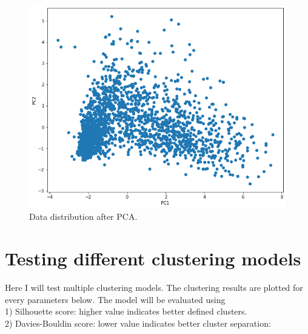 \documentclass[11pt]{article}
\begin{document}
\begin{figure}[h!]
\centerline{\includegraphics[scale=0.6]{clu_3.png}}
\caption{Data distribution after PCA.}
\end{figure}

\section{Testing different clustering models}\label{section-model}
Here I will test multiple clustering models.
The clustering results are plotted for every parameters below.
The model will be evaluated using \\
1) Silhouette score: higher value indicates better defined clusters. \\
2) Davies-Bouldin score: lower value indicates better cluster separation:

\newpage
\end{document}
